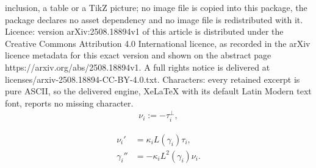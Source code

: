\documentclass[10pt,a4paper]{amsart}
\begin{document}
inclusion, a table or a TikZ picture; no image file is copied into this package, the package declares no asset dependency and no image file is redistributed with it. Licence: version arXiv:2508.18894v1 of this article is distributed under the Creative Commons Attribution 4.0 International licence, as recorded in the arXiv licence metadata for this exact version and shown on the abstract page https://arxiv.org/abs/2508.18894v1. A full rights notice is delivered at licenses/arxiv-2508.18894-CC-BY-4.0.txt. Characters: every retained excerpt is pure ASCII, so the delivered engine, XeLaTeX with its default Latin Modern text font, reports no missing character.
  \begin{align}\label{eq:chosen_normal}
  	\nu_i := - \tau_i^\perp,
  \end{align}

\begin{align}
  \nu_i' & =  \kappa_i L(\gamma_i)
           \tau_i, \label{eq:derivative_normal}\\ 
  \gamma_i'' & = - \kappa_i L^2(\gamma_i)
               \nu_i. \label{eq:second_derivative} 
\end{align}
\end{document}
